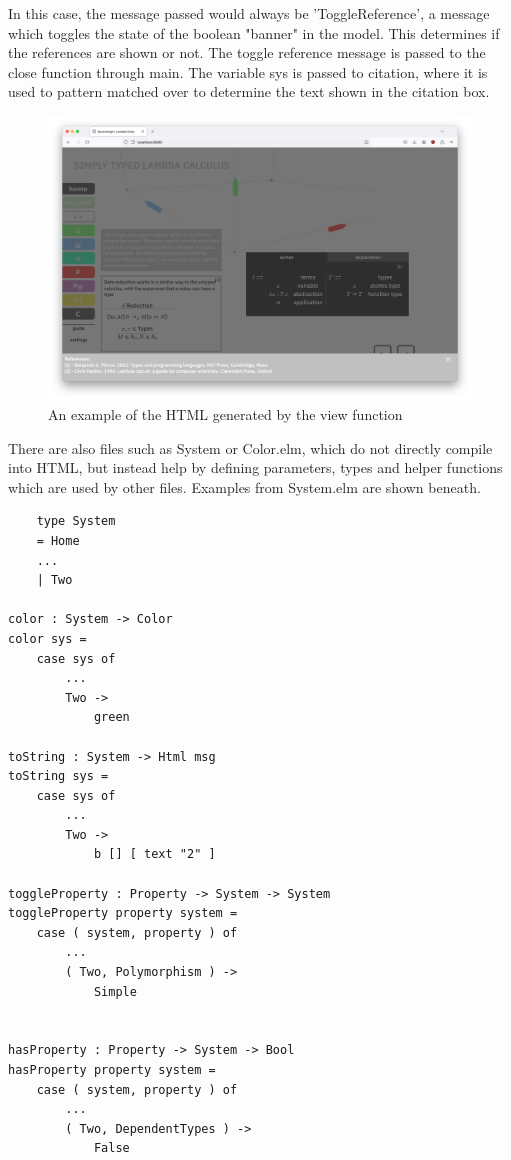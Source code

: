 \documentclass{l4proj}
\begin{document}
In this case, the message passed would always be 'ToggleReference', a message which toggles the state of the boolean "banner" in the model.  This determines if the references are shown or not.  The toggle reference message is passed to the close function through main.  The variable sys is passed to citation, where it is used to pattern matched over to determine the text shown in the citation box.

\begin{figure}[h!]
    \centering
    \includegraphics[width=0.8\linewidth]{dissertation/images/final_citations.png}
    \caption{An example of the HTML generated by the view function}
    \label{fig:enter-label}
\end{figure}

There are also files such as System or Color.elm, which do not directly compile into HTML, but instead help by defining parameters, types and helper functions which are used by other files.  Examples from System.elm are shown beneath.

\begin{lstlisting}
    type System
    = Home
    ...
    | Two

color : System -> Color
color sys =
    case sys of
        ...
        Two ->
            green

toString : System -> Html msg
toString sys =
    case sys of
        ...
        Two ->
            b [] [ text "2" ]

toggleProperty : Property -> System -> System
toggleProperty property system =
    case ( system, property ) of
        ...
        ( Two, Polymorphism ) ->
            Simple


hasProperty : Property -> System -> Bool
hasProperty property system =
    case ( system, property ) of
        ...
        ( Two, DependentTypes ) ->
            False
\end{lstlisting}
\end{document}
